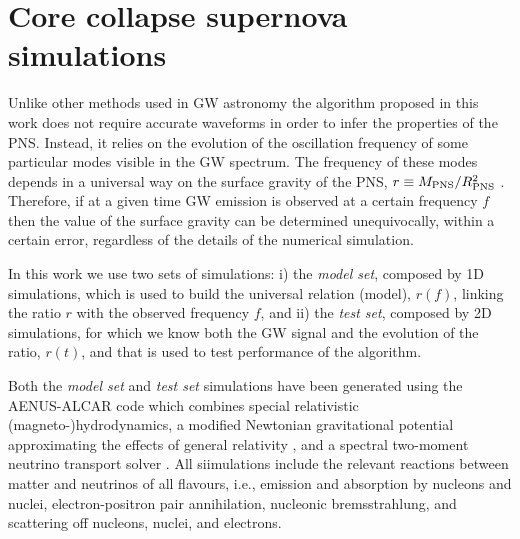 \section{Core collapse supernova simulations}
\label{sec:simulations}

Unlike other methods used in GW astronomy the algorithm proposed in {this work} does not require accurate
waveforms {in order to infer the properties of the PNS.} Instead, it relies on the evolution of the oscillation
frequency of some particular modes visible in the GW spectrum.
The frequency of these modes depends in a universal way on the surface gravity of the PNS, $r\equiv M_{\rm PNS}/R_{\rm PNS}^2$ \citep{Torres:2019b}. Therefore, if at a given time GW emission is observed at a certain
frequency $f$ then the value of the surface gravity can be determined unequivocally, within a certain error,
regardless of the details of the numerical simulation. 

In this work we use two sets of simulations: i) the {\it model set}, composed by 1D simulations, which is used to build the 
universal relation (model), $r(f)$, linking the ratio $r$ with the observed frequency $f$, and ii) the {\it test set}, composed by
2D simulations, 
for which we know both the GW signal and the evolution of the ratio, $r (t)$, and that is used to test
performance of the algorithm.

Both the {\it model set} and {\it test set} simulations have been generated using the AENUS-ALCAR code
\citep{Just_et_al__2015__mnras__Anewmultidimensionalenergy-dependenttwo-momenttransportcodeforneutrino-hydrodynamics}
which combines special relativistic (magneto-)hydrodynamics, a modified
Newtonian gravitational potential approximating the effects of general
relativity \citep{Marek_etal__2006__AA__TOV-potential}, and a spectral
two-moment neutrino transport solver
\citep{Just_et_al__2015__mnras__Anewmultidimensionalenergy-dependenttwo-momenttransportcodeforneutrino-hydrodynamics}.
All siimulations include the relevant reactions between matter and neutrinos of all
flavours, i.e., emission and absorption by nucleons and nuclei,
electron-positron pair annihilation, nucleonic bremsstrahlung, and
scattering off nucleons, nuclei, and electrons.

